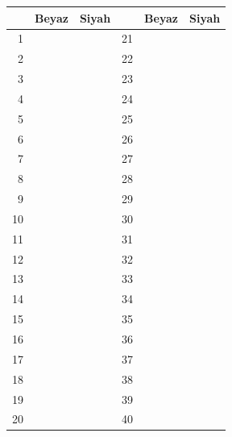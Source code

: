 \documentclass{letter}
\newlength{\rh}
\begin{document}
\begin{tabularx}{\textwidth}{|r|X|X|r|X|X|}\hline
\multicolumn{1}{|c}{~}& Beyaz & Siyah & \multicolumn{1}{|c}{~} & Beyaz & Siyah \\\hline
 1& ~ & ~ & 21& ~ & ~ \\[\rh]\hline
 2& ~ & ~ & 22& ~ & ~ \\[\rh]\hline
 3& ~ & ~ & 23& ~ & ~ \\[\rh]\hline
 4& ~ & ~ & 24& ~ & ~ \\[\rh]\hline
 5& ~ & ~ & 25& ~ & ~ \\[\rh]\hline
 6& ~ & ~ & 26& ~ & ~ \\[\rh]\hline
 7& ~ & ~ & 27& ~ & ~ \\[\rh]\hline
 8& ~ & ~ & 28& ~ & ~ \\[\rh]\hline
 9& ~ & ~ & 29& ~ & ~ \\[\rh]\hline
10& ~ & ~ & 30& ~ & ~ \\[\rh]\hline
11& ~ & ~ & 31& ~ & ~ \\[\rh]\hline
12& ~ & ~ & 32& ~ & ~ \\[\rh]\hline
13& ~ & ~ & 33& ~ & ~ \\[\rh]\hline
14& ~ & ~ & 34& ~ & ~ \\[\rh]\hline
15& ~ & ~ & 35& ~ & ~ \\[\rh]\hline
16& ~ & ~ & 36& ~ & ~ \\[\rh]\hline
17& ~ & ~ & 37& ~ & ~ \\[\rh]\hline
18& ~ & ~ & 38& ~ & ~ \\[\rh]\hline
19& ~ & ~ & 39& ~ & ~ \\[\rh]\hline
20& ~ & ~ & 40& ~ & ~ \\[\rh]\hline
\end{tabularx}
\clearpage
\end{document}
